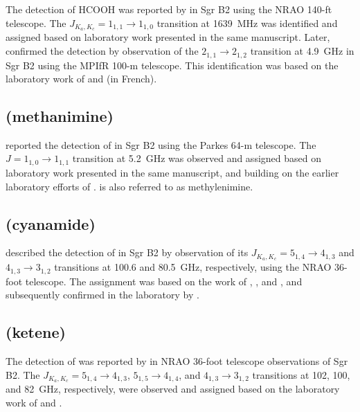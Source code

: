 \documentclass[twocolumn]{aastex631}
\begin{document}
	The detection of HCOOH was reported by \citet{Zuckerman:1971de} in Sgr B2 using the NRAO 140-ft telescope.  The $J_{K_a,K_c} = 1_{1,1}\rightarrow1_{1,0}$ transition at 1639~MHz was identified and assigned based on laboratory work presented in the same manuscript.  Later, \citet{Winnewisser:1975we} confirmed the detection by observation of the $2_{1,1}\rightarrow2_{1,2}$ transition at 4.9~GHz in Sgr B2 using the MPIfR 100-m telescope.  This identification was based on the laboratory work of \citet{Bellet:1971fp} and \citet{Bellet:1971eo} (in French).
	
	\subsection{ (methanimine)}
	\label{CH2NH}
	
	\citet{Godfrey:1973ui} reported the detection of  in Sgr B2 using the Parkes 64-m telescope.  The $J = 1_{1,0}\rightarrow1_{1,1}$ transition at 5.2~GHz was observed and assigned based on laboratory work presented in the same manuscript, and building on the earlier laboratory efforts of \citet{Johnson:1972ij}.   is also referred to as methylenimine.
	
	\subsection{ (cyanamide)}
	\label{NH2CN}
	
	\citet{Turner:1975pf} described the detection of  in Sgr B2 by observation of its $J_{K_a,K_c} = 5_{1,4}\rightarrow4_{1,3}$ and $4_{1,3}\rightarrow3_{1,2}$ transitions at 100.6 and 80.5~GHz, respectively, using the NRAO 36-foot telescope.  The assignment was based on the work of \citet{Lide:1962hd}, \citet{Millen:1962ba}, and \citet{Tyler:1972bd}, and subsequently confirmed in the laboratory by \citet{Johnson:1976ew}.
	
	\subsection{ (ketene)}
	\label{H2CCO}
	
	The detection of  was reported by \citet{Turner:1977ig} in NRAO 36-foot telescope observations of Sgr B2.  The $J_{K_a,K_c} = 5_{1,4}\rightarrow4_{1,3}$, $5_{1,5}\rightarrow4_{1,4}$, and $4_{1,3}\rightarrow3_{1,2}$ transitions at 102, 100, and 82~GHz, respectively, were observed and assigned based on the laboratory work of \citet{Johnson:1952dp} and \citet{Johns:1972hd}.
	
\end{document}
